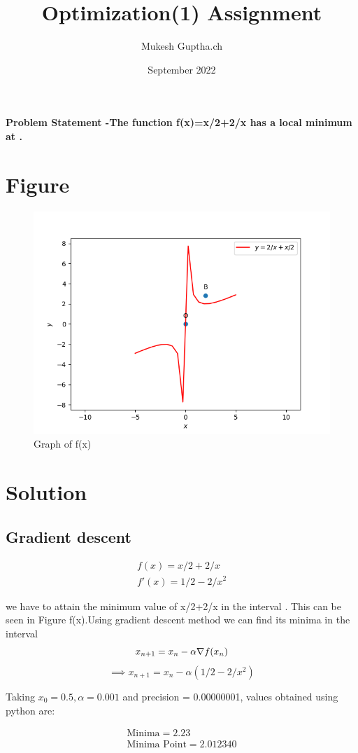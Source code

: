 \documentclass[journal,10pt,twocolumn]{article}
\title{\textbf{Optimization(1) Assignment}}
\author{Mukesh Guptha.ch}
\date{September 2022}
\begin{document}
\maketitle
\paragraph{\textbf{Problem Statement} -The function f(x)=x/2+2/x has a local minimum at .}

\section*{\large Figure}

\begin{figure}[H]
\centering
\includegraphics[width=1\columnwidth]{Figure_1.png}
\caption{Graph of f(x)}
\label{fig:triangle}
\end{figure}
\section*{\large Solution}

 
    \subsection*{\normalsize Gradient descent}
    
    
    \begin{align}
 \label{eq:vol_varx}
 f(x) = x/2+2/x\\
    f'(x) = 1/2-2/x^2
 \end{align}

we have to attain the minimum value of x/2+2/x in the interval . This can be seen in Figure f(x).Using gradient descent method we can find its minima in the interval 
\begin{equation}
        x_{n+1} = x_n - \alpha \nabla f(x_n) \\
\end{equation}
\vspace{1mm}
\begin{equation}
\implies x_{n+1}=x_n-\alpha(1/2-2/x^2)
\end{equation}

Taking $x_0=0.5,\alpha=0.001$ and precision = 0.00000001, values obtained using python are:
    

    \begin{align}
        \boxed{\text{Minima} = 2.23}\\
        \boxed{\text{Minima Point} }= 2.012340\\
    \end{align}
\end{document}
